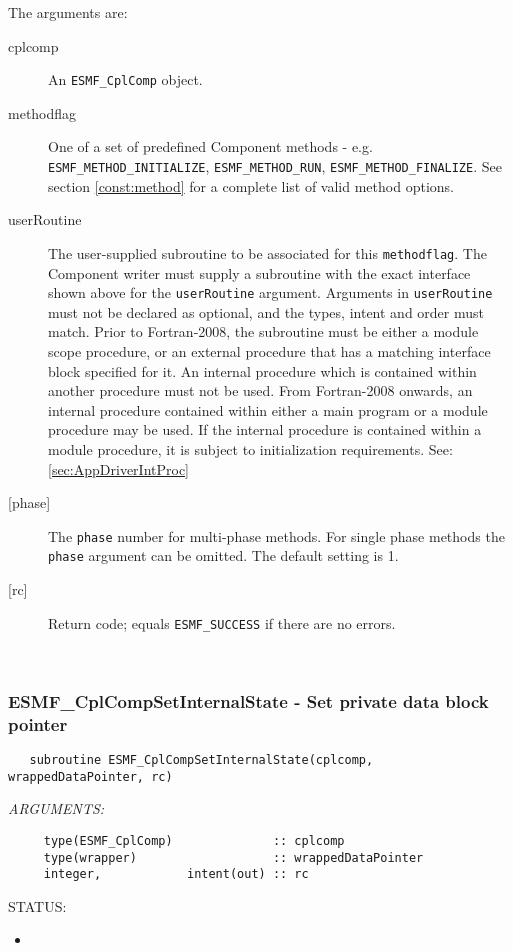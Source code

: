    The arguments are:
   \begin{description}
   \item[cplcomp]
     An {\tt ESMF\_CplComp} object.
   \item[methodflag]
     \begin{sloppypar}
     One of a set of predefined Component methods - e.g.
     {\tt ESMF\_METHOD\_INITIALIZE}, {\tt ESMF\_METHOD\_RUN},
     {\tt ESMF\_METHOD\_FINALIZE}. See section \ref{const:method}
     for a complete list of valid method options.
     \end{sloppypar}
   \item[userRoutine]
     The user-supplied subroutine to be associated for this {\tt methodflag}.
     The Component writer must supply a subroutine with the exact interface
     shown above for the {\tt userRoutine} argument. Arguments in {\tt userRoutine}
     must not be declared as optional, and the types, intent and order must match.
     Prior to Fortran-2008, the subroutine must be either a module scope procedure,
     or an external procedure that has a matching interface block specified for it.
     An internal procedure which is contained within another procedure must not be used.
     From Fortran-2008 onwards, an internal procedure contained within either a main program
     or a module procedure may be used.  If the internal procedure is contained within a
     module procedure, it is subject to initialization requirements.  See: \ref{sec:AppDriverIntProc}
   \item[{[phase]}]
     The {\tt phase} number for multi-phase methods. For single phase
     methods the {\tt phase} argument can be omitted. The default setting
     is 1.
   \item[{[rc]}]
     Return code; equals {\tt ESMF\_SUCCESS} if there are no errors.
   \end{description}
   
 
\mbox{}\hrulefill\ 
 
\subsubsection [ESMF\_CplCompSetInternalState] {ESMF\_CplCompSetInternalState - Set private data block pointer}


  
\begin{verbatim}   subroutine ESMF_CplCompSetInternalState(cplcomp, wrappedDataPointer, rc)\end{verbatim}{\em ARGUMENTS:}
\begin{verbatim}     type(ESMF_CplComp)              :: cplcomp
     type(wrapper)                   :: wrappedDataPointer
     integer,            intent(out) :: rc\end{verbatim}
{\sf STATUS:}
   \begin{itemize}
   \item{}
   \end{itemize}
  
